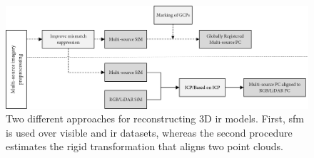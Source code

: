 \begin{figure}[ht]
	\includegraphics[width=\linewidth]{figs/context/fusion_01.png}
	\caption{Two different approaches for reconstructing 3D \acrshort{ir} models. First, \acrshort{sfm} is used over visible and \acrshort{ir} datasets, whereas the second procedure estimates the rigid transformation that aligns two point clouds. }
    \label{fig:fusion_data_01}
\end{figure}

